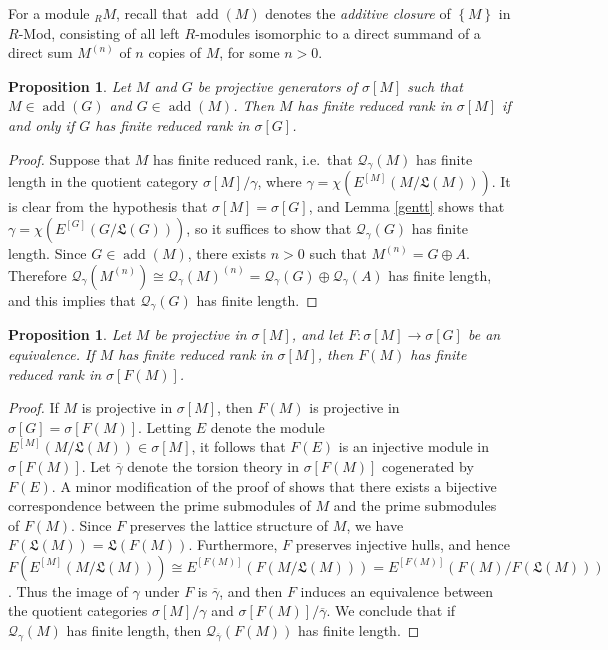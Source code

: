 \documentclass{amsart}
\newtheorem{prop}[thm]{Proposition}
\theoremstyle{definition}
\theoremstyle{remark}
\numberwithin{equation}{section}
\DeclareMathOperator{\add}{add}
\newcommand{\sm}{\sigma[M]}
\begin{document}
	
	For a module $_R M$,
	recall that $\add (M)$ denotes the \emph{additive closure} 
	of $\left\{ M \right\}$ in $R$-Mod,
	consisting of all left $R$-modules isomorphic to a direct summand 
	of a direct sum $M^{(n)}$ of $n$ copies of $M$, for some $n>0$.
	
	\begin{prop}\label{rrpg}
		Let $M$ and $G$ be projective generators of $\sm$ 
		such that $M\in\add(G)$ and $G\in\add(M)$. 
		Then $M$ has finite reduced rank in $\sm$ 
		if and only if 
		$G$ has finite reduced rank in $\sigma[G]$.
	\end{prop}
	
	\begin{proof}
		Suppose that $M$ has finite reduced rank, 
		i.e.\ that $\mathcal{Q}_\gamma(M)$ has finite length 
		in the quotient category $\sm/\gamma$, 
		where $\gamma=\chi(E^{[M]}(M/\mathfrak{L}(M)))$.
		It is clear from the hypothesis that $\sm = \sigma [G]$,
		and Lemma \ref{gentt} shows that $\gamma=\chi(E^{[G]}(G/\mathfrak{L}(G)))$,
		so it suffices to show that $\mathcal{Q}_\gamma(G)$ has finite length.
		Since $G\in\add(M)$, there exists $n>0$ such that $M^{(n)}=G\oplus A$. 
		Therefore 
		$\mathcal{Q}_\gamma(M^{(n)})\cong\mathcal{Q}_\gamma(M)^{(n)}
		=\mathcal{Q}_\gamma(G)\oplus\mathcal{Q}_\gamma(A)$ 
		has finite length, 
		and this implies that $\mathcal{Q}_\gamma(G)$ has finite length. 
	\end{proof}
	
	\begin{prop}\label{rreq}
		Let $M$ be projective in $\sm$, 
		and let $F:\sm\to \sigma[G]$ be an equivalence. 
		If $M$ has finite reduced rank in $\sm$,
		then $F(M)$ has finite reduced rank in $\sigma[F(M)]$.
	\end{prop}
	
	\begin{proof}
		If $M$ is projective in $\sm$,
		then $F(M)$ is projective in $\sigma[G]=\sigma[F(M)]$. 
		Letting $E$ denote the module $E^{[M]}(M/\mathfrak{L}(M))\in\sm$, 
		it follows that $F(E)$ is an injective module in $\sigma[F(M)]$. 
		Let $\overline{\gamma}$ denote 
		the torsion theory in $\sigma[F(M)]$ cogenerated by $F(E)$. 
		A minor modification of the proof of \cite[Corollary 5.2]{beachy2020fully} 
		shows that there exists a bijective correspondence 
		between the prime submodules of $M$ 
		and the prime submodules of $F(M)$. 
		Since $F$ preserves the lattice structure of $M$, 
		we have $F(\mathfrak{L}(M))=\mathfrak{L}(F(M))$. 
		Furthermore, $F$ preserves injective hulls, 
		and hence 
		$F(E^{[M]}(M/\mathfrak{L}(M)))
		\cong E^{[F(M)]}(F(M/\mathfrak{L}(M)))
		=E^{[F(M)]}(F(M)/F(\mathfrak{L}(M)))$. 
		Thus the image of $\gamma$ under $F$ is $\overline{\gamma}$, 
		and then $F$ induces an equivalence 
		between the quotient categories $\sm/\gamma$ 
		and $\sigma[F(M)]/\overline{\gamma}$. 
		We conclude that if $\mathcal{Q}_\gamma(M)$ has finite length, 
		then $\mathcal{Q}_{\overline{\gamma}}(F(M))$ has finite length.
	\end{proof}
	
\end{document}

